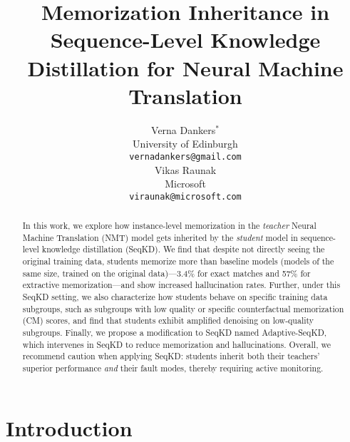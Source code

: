 \documentclass[11pt]{article}
\title{Memorization Inheritance in Sequence-Level Knowledge\\
Distillation for Neural Machine Translation}
\author{Verna Dankers$^*$ \\
  University of Edinburgh \\
  \texttt{vernadankers@gmail.com} \\\And
  Vikas Raunak \\
  Microsoft \\
  \texttt{viraunak@microsoft.com} \\}
\begin{document}
\newcommand{\appendixshortcut}{Appendix}
\newcommand{\figureshortcut}{Figure}

\maketitle
\begin{abstract}
In this work, we explore how instance-level memorization in 
the \textit{teacher} Neural Machine Translation (NMT) model gets inherited by the \textit{student} model in sequence-level knowledge distillation (SeqKD). We find that despite not directly seeing the original training data, students memorize more than baseline models (models of the same size, trained on the original data)---3.4\% for exact matches and 57\% for extractive memorization---and show increased hallucination rates. Further, under this SeqKD setting, we also characterize how students behave on specific training data subgroups, such as subgroups with low quality or specific counterfactual memorization (CM) scores, and find that students exhibit amplified denoising on low-quality subgroups. Finally, we propose a modification to SeqKD named Adaptive-SeqKD, which intervenes in SeqKD to reduce memorization and hallucinations.
Overall, we recommend caution when applying SeqKD: students inherit both their teachers' superior performance \textit{and} their fault modes, thereby requiring active monitoring.
\end{abstract}

\section{Introduction}
\begingroup\def\thefootnote{*}\endgroup








\clearpage
\appendix

\end{document}
